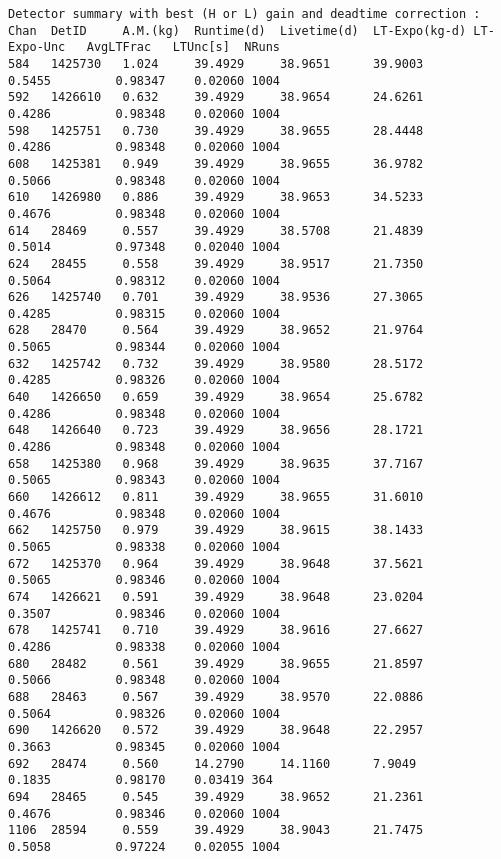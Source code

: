 \documentclass[notitlepage,rmp,aps,10pt]{revtex4-1}
\begin{document}
\begin{verbatim}
Detector summary with best (H or L) gain and deadtime correction :
Chan  DetID     A.M.(kg)  Runtime(d)  Livetime(d)  LT-Expo(kg-d) LT-Expo-Unc   AvgLTFrac   LTUnc[s]  NRuns
584   1425730   1.024     39.4929     38.9651      39.9003        0.5455         0.98347    0.02060 1004
592   1426610   0.632     39.4929     38.9654      24.6261        0.4286         0.98348    0.02060 1004
598   1425751   0.730     39.4929     38.9655      28.4448        0.4286         0.98348    0.02060 1004
608   1425381   0.949     39.4929     38.9655      36.9782        0.5066         0.98348    0.02060 1004
610   1426980   0.886     39.4929     38.9653      34.5233        0.4676         0.98348    0.02060 1004
614   28469     0.557     39.4929     38.5708      21.4839        0.5014         0.97348    0.02040 1004
624   28455     0.558     39.4929     38.9517      21.7350        0.5064         0.98312    0.02060 1004
626   1425740   0.701     39.4929     38.9536      27.3065        0.4285         0.98315    0.02060 1004
628   28470     0.564     39.4929     38.9652      21.9764        0.5065         0.98344    0.02060 1004
632   1425742   0.732     39.4929     38.9580      28.5172        0.4285         0.98326    0.02060 1004
640   1426650   0.659     39.4929     38.9654      25.6782        0.4286         0.98348    0.02060 1004
648   1426640   0.723     39.4929     38.9656      28.1721        0.4286         0.98348    0.02060 1004
658   1425380   0.968     39.4929     38.9635      37.7167        0.5065         0.98343    0.02060 1004
660   1426612   0.811     39.4929     38.9655      31.6010        0.4676         0.98348    0.02060 1004
662   1425750   0.979     39.4929     38.9615      38.1433        0.5065         0.98338    0.02060 1004
672   1425370   0.964     39.4929     38.9648      37.5621        0.5065         0.98346    0.02060 1004
674   1426621   0.591     39.4929     38.9648      23.0204        0.3507         0.98346    0.02060 1004
678   1425741   0.710     39.4929     38.9616      27.6627        0.4286         0.98338    0.02060 1004
680   28482     0.561     39.4929     38.9655      21.8597        0.5066         0.98348    0.02060 1004
688   28463     0.567     39.4929     38.9570      22.0886        0.5064         0.98326    0.02060 1004
690   1426620   0.572     39.4929     38.9648      22.2957        0.3663         0.98345    0.02060 1004
692   28474     0.560     14.2790     14.1160      7.9049         0.1835         0.98170    0.03419 364
694   28465     0.545     39.4929     38.9652      21.2361        0.4676         0.98346    0.02060 1004
1106  28594     0.559     39.4929     38.9043      21.7475        0.5058         0.97224    0.02055 1004

\end{verbatim}
\end{document}
